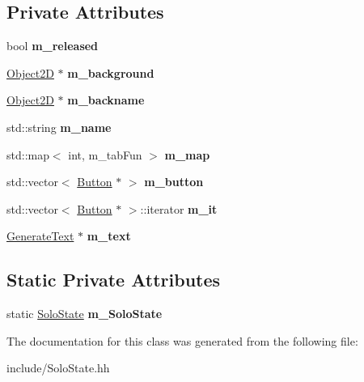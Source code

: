 \subsection*{Private Attributes}
\begin{DoxyCompactItemize}
\item 
\hypertarget{class_solo_state_a0e5b3026a3604cc6690c0899c6592ab7}{}bool {\bfseries m\+\_\+released}\label{class_solo_state_a0e5b3026a3604cc6690c0899c6592ab7}

\item 
\hypertarget{class_solo_state_a98c9cdd18bcff43a3602112c876b70d1}{}\hyperlink{class_object2_d}{Object2\+D} $\ast$ {\bfseries m\+\_\+background}\label{class_solo_state_a98c9cdd18bcff43a3602112c876b70d1}

\item 
\hypertarget{class_solo_state_a8bc6d3fabb420354a9dbec18bff4c5e7}{}\hyperlink{class_object2_d}{Object2\+D} $\ast$ {\bfseries m\+\_\+backname}\label{class_solo_state_a8bc6d3fabb420354a9dbec18bff4c5e7}

\item 
\hypertarget{class_solo_state_af62d51b1f91ab89adc46acf4357bdbdc}{}std\+::string {\bfseries m\+\_\+name}\label{class_solo_state_af62d51b1f91ab89adc46acf4357bdbdc}

\item 
\hypertarget{class_solo_state_a922032a637de652a49730b64677df608}{}std\+::map$<$ int, m\+\_\+tab\+Fun $>$ {\bfseries m\+\_\+map}\label{class_solo_state_a922032a637de652a49730b64677df608}

\item 
\hypertarget{class_solo_state_a0ac8e089a4653c56d80683bd6ae7211f}{}std\+::vector$<$ \hyperlink{class_button}{Button} $\ast$ $>$ {\bfseries m\+\_\+button}\label{class_solo_state_a0ac8e089a4653c56d80683bd6ae7211f}

\item 
\hypertarget{class_solo_state_a6c88fa29ce4cad0167df71569df18b6f}{}std\+::vector$<$ \hyperlink{class_button}{Button} $\ast$ $>$\+::iterator {\bfseries m\+\_\+it}\label{class_solo_state_a6c88fa29ce4cad0167df71569df18b6f}

\item 
\hypertarget{class_solo_state_aca743590bb3be5c4086a6229f6db48d6}{}\hyperlink{class_generate_text}{Generate\+Text} $\ast$ {\bfseries m\+\_\+text}\label{class_solo_state_aca743590bb3be5c4086a6229f6db48d6}

\end{DoxyCompactItemize}
\subsection*{Static Private Attributes}
\begin{DoxyCompactItemize}
\item 
\hypertarget{class_solo_state_a6cef24d652396a4e74f66ba25eac372f}{}static \hyperlink{class_solo_state}{Solo\+State} {\bfseries m\+\_\+\+Solo\+State}\label{class_solo_state_a6cef24d652396a4e74f66ba25eac372f}

\end{DoxyCompactItemize}


The documentation for this class was generated from the following file\+:\begin{DoxyCompactItemize}
\item 
include/Solo\+State.\+hh\end{DoxyCompactItemize}
